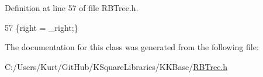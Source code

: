 Definition at line 57 of file R\+B\+Tree.\+h.


\begin{DoxyCode}
57 \{right  = \_right;\}
\end{DoxyCode}


The documentation for this class was generated from the following file\+:\begin{DoxyCompactItemize}
\item 
C\+:/\+Users/\+Kurt/\+Git\+Hub/\+K\+Square\+Libraries/\+K\+K\+Base/\hyperlink{_r_b_tree_8h}{R\+B\+Tree.\+h}\end{DoxyCompactItemize}
